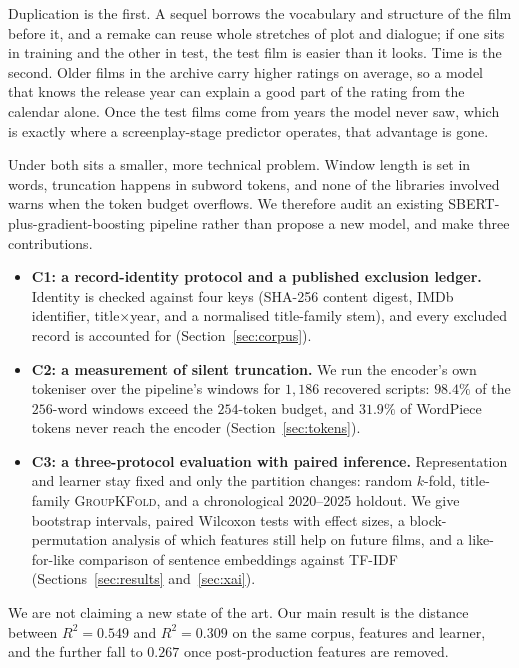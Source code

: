 \documentclass[conference,a4paper]{IEEEtran}
\newcommand{\hlt}[1]{\textbf{#1}}
\begin{document}
Duplication is the first. A sequel borrows the vocabulary and structure
of the film before it, and a remake can reuse whole stretches of plot and
dialogue; if one sits in training and the other in test, the test film is
easier than it looks. Time is the second. Older films in the archive
carry higher ratings on average, so a model that knows the release year
can explain a good part of the rating from the calendar alone. Once the
test films come from years the model never saw, which is exactly where a
screenplay-stage predictor operates, that advantage is gone.

Under both sits a smaller, more technical problem. Window length is set
in words, truncation happens in subword tokens, and none of the libraries
involved warns when the token budget overflows. We therefore audit an
existing SBERT-plus-gradient-boosting pipeline rather than propose a new
model, and make three contributions.

\begin{itemize}
\item \hlt{C1: a record-identity protocol and a published exclusion
  ledger.} Identity is checked against four keys (SHA-256 content digest,
  IMDb identifier, title$\times$year, and a normalised title-family
  stem), and every excluded record is accounted for
  (Section~\ref{sec:corpus}).
\item \hlt{C2: a measurement of silent truncation.} We run the encoder's
  own tokeniser over the pipeline's windows for $1{,}186$ recovered
  scripts: $98.4\%$ of the $256$-word windows exceed the $254$-token
  budget, and $31.9\%$ of WordPiece tokens never reach the encoder
  (Section~\ref{sec:tokens}).
\item \hlt{C3: a three-protocol evaluation with paired inference.}
  Representation and learner stay fixed and only the partition changes:
  random $k$-fold, title-family \textsc{GroupKFold}, and a chronological
  2020--2025 holdout. We give bootstrap intervals, paired Wilcoxon tests
  with effect sizes, a block-permutation analysis of which features still
  help on future films, and a like-for-like comparison of sentence
  embeddings against TF-IDF (Sections~\ref{sec:results}
  and~\ref{sec:xai}).
\end{itemize}

We are not claiming a new state of the art. Our main result is the
distance between $R^{2}=0.549$ and $R^{2}=0.309$ on the same corpus,
features and learner, and the further fall to $0.267$ once
post-production features are removed.
\end{document}
